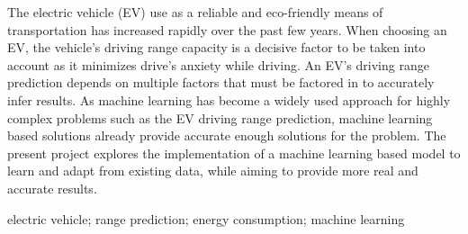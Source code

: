 \abstractEN %



The electric vehicle (EV) use as a reliable
and eco-friendly means of transportation has increased
rapidly over the past few years.
When choosing an EV, the vehicle's driving range capacity is a 
decisive factor to be taken into account as it
 minimizes drive's anxiety while driving.
An EV's driving range prediction depends on multiple
factors that must be factored in to accurately infer results.
As machine learning has become a widely used approach
for highly complex problems such as the EV driving range
prediction, machine learning based solutions already
provide accurate enough solutions for the problem.
The present project explores the implementation of
a machine learning based model to learn and adapt
from existing data, while aiming to provide more
real and accurate results.


%
%
%
%
%
%
%
%

\begin{keywords}
    electric vehicle;
    range prediction;
    energy consumption;
    machine learning
\end{keywords} 
